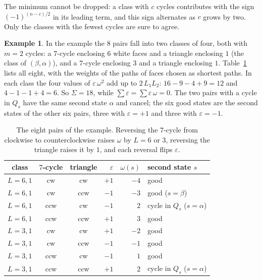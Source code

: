 \documentclass[10pt]{amsart}
\numberwithin{equation}{section}
\theoremstyle{definition}
\newtheorem{example}[equation]{Example}
\theoremstyle{remark}
\newcommand{\eps}{\varepsilon}
\begin{document}
The minimum cannot be dropped: a class with $c$ cycles contributes with the sign $(-1)^{(n-c)/2}$ in its leading term, and this sign alternates as $c$ grows by two.
Only the classes with the fewest cycles are sure to agree.

\begin{example}\label{ex:count}
In the example the $8$ pairs fall into two classes of four, both with $m=2$ cycles: a $7$-cycle enclosing $6$ white faces and a triangle enclosing $1$ (the class of $(\beta,\alpha)$), and a $7$-cycle enclosing $3$ and a triangle enclosing $1$.
Table~\ref{tab:pairs} lists all eight, with the weights of the paths of faces chosen as shortest paths.
In each class the four values of $\eps\,\omega^2$ add up to $2\,L_1L_2$: $16-9-4+9=12$ and $4-1-1+4=6$.
So $\Sigma=18$, while $\sum\eps=\sum\eps\,\omega=0$.
The two pairs with a cycle in $Q_s$ have the same second state $\alpha$ and cancel; the six good states are the second states of the other six pairs, three with $\eps=+1$ and three with $\eps=-1$.
\end{example}

\begin{table}[tb]
\centering
\begin{tabular}{@{}cccrrl@{}}
\toprule
class & $7$-cycle & triangle & $\eps$ & $\omega(s)$ & second state $s$ \\
\midrule
$L=6,1$ & cw & cw & $+1$ & $-4$ & good \\
$L=6,1$ & cw & ccw & $-1$ & $-3$ & good ($s=\beta$) \\
$L=6,1$ & ccw & cw & $-1$ & $2$ & cycle in $Q_s$ ($s=\alpha$) \\
$L=6,1$ & ccw & ccw & $+1$ & $3$ & good \\
\midrule
$L=3,1$ & cw & cw & $+1$ & $-2$ & good \\
$L=3,1$ & cw & ccw & $-1$ & $-1$ & good \\
$L=3,1$ & ccw & cw & $-1$ & $1$ & good \\
$L=3,1$ & ccw & ccw & $+1$ & $2$ & cycle in $Q_s$ ($s=\alpha$) \\
\bottomrule
\end{tabular}
\vspace{4pt}
\caption{The eight pairs of the example. Reversing the $7$-cycle from clockwise to counterclockwise raises $\omega$ by $L=6$ or $3$, reversing the triangle raises it by $1$, and each reversal flips $\eps$.}
\label{tab:pairs}
\end{table}
\end{document}
